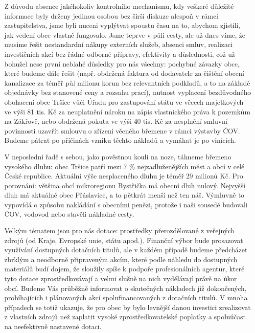 \documentclass[11pt]{article}
\begin{document}
\begin{multicols}{2}
{Z důvodu absence jakéhokoliv kontrolního mechanismu, kdy veškeré důležité informace byly drženy jedinou osobou bez širší diskuze alespoň v rámci zastupitelstva, jsme byli nuceni vyplýtvat spoustu času na to, abychom zjistili, jak vedení obce vlastně fungovalo. Jsme teprve v půli cesty, ale už dnes víme, že musíme řešit nestandardní nákupy externích služeb, absenci smluv, realizaci investičních akcí bez řádné odborné přípravy, efektivity a důslednosti, což už bohužel nese první neblahé důsledky pro nás všechny: pochybné závazky obce, které budeme dále řešit (např. obdržená faktura od dodavatele za čištění obecní kanalizace za téměř půl milionu korun bez relevantních podkladů, a to na základě objednávky bez stanovené ceny a rozsahu prací), nutnost vyplacení bezdůvodného obohacení obce Tršice vůči Úřadu pro zastupování státu ve věcech majetkových ve výši 81 tis. Kč za neuplatnění nároku na zápis vlastnického práva k pozemkům na Zákřově, nebo obdržená pokuta ve výši 40 tis. Kč za nesplnění smluvní povinnosti uzavřít smlouvu o zřízení věcného břemene v rámci výstavby ČOV. Budeme pátrat po příčinách vzniku těchto nákladů a vymáhat je po vinících.

V neposlední řadě s sebou, jako pověstnou kouli na noze, táhneme břemeno vysokého dluhu: obec Tršice patří mezi 7 \% nejzadluženějších měst a obcí v celé České republice. Aktuální výše nesplaceného dluhu je téměř 29 milionů Kč. Pro porovnání: většina obcí mikroregionu Bystřička má obecní dluh nulový. Nejvyšší dluh má aktuálně obec Přáslavice, a to pětkrát menší než ten náš. Výmluvně to vypovídá o způsobu nakládání s obecními penězi, protože i naši sousedé budovali ČOV, vodovod nebo stavěli nákladné cesty.

Velkým tématem jsou pro nás dotace: prostředky přerozdělované z veřejných zdrojů (od Kraje, Evropské unie, státu apod.). Finanční výbor bude prosazovat využívání dostupných dotačních titulů, ale v každém případě budeme předcházet zbrklým a neodborně připraveným akcím, které podle náhledu do dostupných materiálů budí dojem, že sloužily spíše k podpoře profesionálních agentur, které tyto dotace zprostředkovávají a velmi slušně na nich vydělávají právě na úkor obcí. Budeme Vás průběžně informovat o skutečných nákladech již dokončených, probíhajících i plánovaných akcí spolufinancovaných z dotačních titulů. V mnoha případech se totiž ukazuje, že pro obec by bylo levnější danou investici zrealizovat z vlastních zdrojů než zaplatit vysoké zprostředkovatelské poplatky a spoluúčast na neefektivně nastavené dotaci.

}
\end{multicols}
\end{document}

